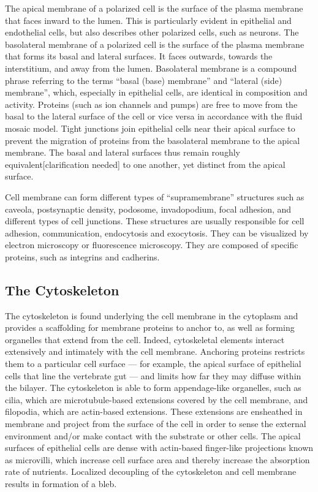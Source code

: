 The apical membrane of a polarized cell is the surface of the plasma membrane that faces inward to the lumen. This is particularly evident in epithelial and endothelial cells, but also describes other polarized cells, such as neurons. The basolateral membrane of a polarized cell is the surface of the plasma membrane that forms its basal and lateral surfaces. It faces outwards, towards the interstitium, and away from the lumen. Basolateral membrane is a compound phrase referring to the terms ``basal (base) membrane'' and ``lateral (side) membrane'', which, especially in epithelial cells, are identical in composition and activity. Proteins (such as ion channels and pumps) are free to move from the basal to the lateral surface of the cell or vice versa in accordance with the fluid mosaic model. Tight junctions join epithelial cells near their apical surface to prevent the migration of proteins from the basolateral membrane to the apical membrane. The basal and lateral surfaces thus remain roughly equivalent{[}clarification needed{]} to one another, yet distinct from the apical surface.

Cell membrane can form different types of ``supramembrane'' structures such as caveola, postsynaptic density, podosome, invadopodium, focal adhesion, and different types of cell junctions. These structures are usually responsible for cell adhesion, communication, endocytosis and exocytosis. They can be visualized by electron microscopy or fluorescence microscopy. They are composed of specific proteins, such as integrins and cadherins.

\hypertarget{the-cytoskeleton-1}{%
\subsection{The Cytoskeleton}\label{the-cytoskeleton-1}}

The cytoskeleton is found underlying the cell membrane in the cytoplasm and provides a scaffolding for membrane proteins to anchor to, as well as forming organelles that extend from the cell. Indeed, cytoskeletal elements interact extensively and intimately with the cell membrane. Anchoring proteins restricts them to a particular cell surface --- for example, the apical surface of epithelial cells that line the vertebrate gut --- and limits how far they may diffuse within the bilayer. The cytoskeleton is able to form appendage-like organelles, such as cilia, which are microtubule-based extensions covered by the cell membrane, and filopodia, which are actin-based extensions. These extensions are ensheathed in membrane and project from the surface of the cell in order to sense the external environment and/or make contact with the substrate or other cells. The apical surfaces of epithelial cells are dense with actin-based finger-like projections known as microvilli, which increase cell surface area and thereby increase the absorption rate of nutrients. Localized decoupling of the cytoskeleton and cell membrane results in formation of a bleb.

